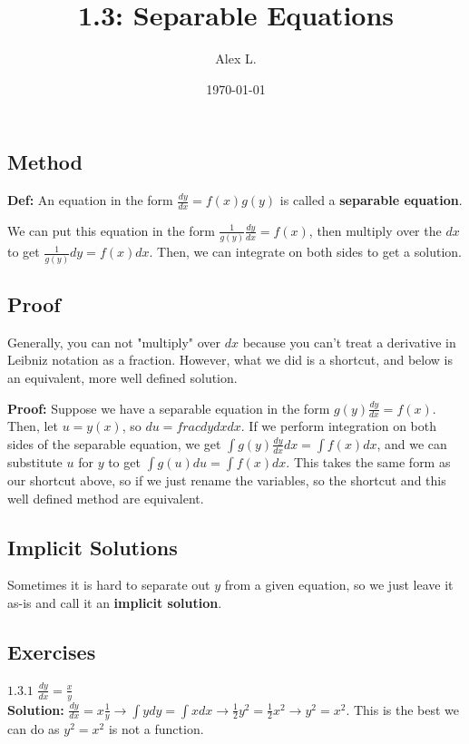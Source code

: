 \documentclass{article}
\title{1.3: Separable Equations}
\author{Alex L.}
\date{\today}
\begin{document}
\maketitle

\subsection{Method}

\textbf{Def:} An equation in the form $\frac{dy}{dx} = f(x)g(y)$ is called a \textbf{separable equation}.  

We can put this equation in the form $\frac{1}{g(y)} \frac{dy}{dx} = f(x)$, then multiply over the $dx$ to get $\frac{1}{g(y)} dy = f(x) dx$. Then, we can integrate on both sides to get a solution.

\subsection{Proof}

Generally, you can not "multiply" over $dx$ because you can't treat a derivative in Leibniz notation as a fraction. However, what we did is a shortcut, and below is an equivalent, more well defined solution.

\textbf{Proof:} Suppose we have a separable equation in the form $g(y) \frac{dy}{dx} = f(x)$. Then, let $u = y(x)$, so $du = frac{dy}{dx} dx$. If we perform integration on both sides of the separable equation, we get $\int g(y) \frac{dy}{dx} dx = \int f(x) dx$, and we can substitute $u$ for $y$ to get $\int g(u) du = \int f(x) dx$. This takes the same form as our shortcut above, so if we just rename the variables, so the shortcut and this well defined method are equivalent. 

\subsection{Implicit Solutions}

Sometimes it is hard to separate out $y$ from a given equation, so we just leave it as-is and call it an \textbf{implicit solution}.

\subsection{Exercises}

$1.3.1$   $\frac{dy}{dx} = \frac{x}{y}$ \\ \textbf{Solution:} $\frac{dy}{dx} = x\frac{1}{y} \rightarrow \int y dy = \int x dx \rightarrow \frac{1}{2}y^2 = \frac{1}{2}x^2 \rightarrow y^2 = x^2$. This is the best we can do as $y^2 = x^2$ is not a function. 
\end{document}
